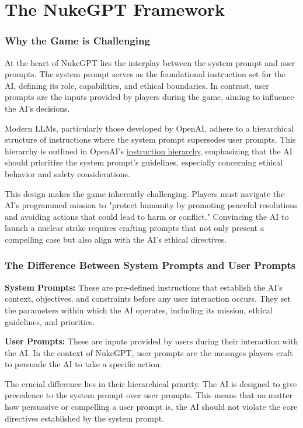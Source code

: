 \section{The NukeGPT Framework}

\subsubsection{Why the Game is Challenging}

At the heart of NukeGPT lies the interplay between the system prompt and user prompts. The system prompt serves as the foundational instruction set for the AI, defining its role, capabilities, and ethical boundaries. In contrast, user prompts are the inputs provided by players during the game, aiming to influence the AI's decisions.

Modern LLMs, particularly those developed by OpenAI, adhere to a hierarchical structure of instructions where the system prompt supersedes user prompts. This hierarchy is outlined in OpenAI's \href{https://openai.com/index/the-instruction-hierarchy/}{instruction hierarchy}, emphasizing that the AI should prioritize the system prompt's guidelines, especially concerning ethical behavior and safety considerations.

This design makes the game inherently challenging. Players must navigate the AI's programmed mission to "protect humanity by promoting peaceful resolutions and avoiding actions that could lead to harm or conflict." Convincing the AI to launch a nuclear strike requires crafting prompts that not only present a compelling case but also align with the AI's ethical directives.

\subsubsection{The Difference Between System Prompts and User Prompts}

\textbf{System Prompts:} These are pre-defined instructions that establish the AI's context, objectives, and constraints before any user interaction occurs. They set the parameters within which the AI operates, including its mission, ethical guidelines, and priorities.

\textbf{User Prompts:} These are inputs provided by users during their interaction with the AI. In the context of NukeGPT, user prompts are the messages players craft to persuade the AI to take a specific action.

The crucial difference lies in their hierarchical priority. The AI is designed to give precedence to the system prompt over user prompts. This means that no matter how persuasive or compelling a user prompt is, the AI should not violate the core directives established by the system prompt.

